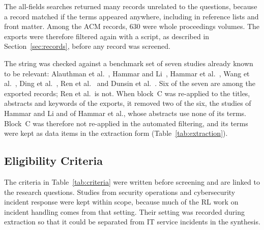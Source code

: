 The all-fields searches returned many records unrelated to the questions, because a record matched if the terms appeared anywhere, including in reference lists and front matter. Among the ACM records, 630 were whole proceedings volumes. The exports were therefore filtered again with a script, as described in Section~\ref{sec:records}, before any record was screened.

The string was checked against a benchmark set of seven studies already known to be relevant: Alauthman et al.~\cite{alauthman2026}, Hammar and Li~\cite{hammar2025}, Hammar et al.~\cite{hammar2026belief}, Wang et al.~\cite{wang2023hrlhf}, Ding et al.~\cite{ding2023}, Ren et al.~\cite{ren2025} and Dunsin et al.~\cite{dunsin2025}. Six of the seven are among the exported records; Ren et al.\ is not. When block~C was re-applied to the titles, abstracts and keywords of the exports, it removed two of the six, the studies of Hammar and Li and of Hammar et al., whose abstracts use none of its terms. Block~C was therefore not re-applied in the automated filtering, and its terms were kept as data items in the extraction form (Table~\ref{tab:extraction}).

\subsection{Eligibility Criteria}

The criteria in Table~\ref{tab:criteria} were written before screening and are linked to the research questions. Studies from security operations and cybersecurity incident response were kept within scope, because much of the RL work on incident handling comes from that setting. Their setting was recorded during extraction so that it could be separated from IT service incidents in the synthesis.

